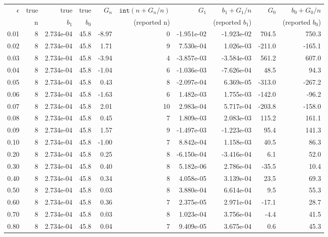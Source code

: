 \begin{tabular}{rrrrrrrrrr}
$\epsilon$ &  true &  true &  true &  $G_n$ &  $\texttt{int}(n+G_n/n)$ &  $G_1$ &  $b_1 + G_1/n$ &  $G_0$ &  $b_0 + G_0/n$\\ 
 &  n &  $b_1$ &  $b_0$ &   &  (reported n) &   &  (reported $b_1$) &   &  (reported $b_0$)\\ 
\hline
 \hline
 0.01 &  8 &  2.734e-04 &  45.8 &  -8.97 &  0 &  -1.951e-02 &  -1.923e-02 &  704.5 &  750.3\\ 
0.02 &  8 &  2.734e-04 &  45.8 &  1.71 &  9 &  7.530e-04 &  1.026e-03 &  -211.0 &  -165.1\\ 
0.03 &  8 &  2.734e-04 &  45.8 &  -3.94 &  4 &  -3.857e-03 &  -3.584e-03 &  561.2 &  607.0\\ 
0.04 &  8 &  2.734e-04 &  45.8 &  -1.04 &  6 &  -1.036e-03 &  -7.626e-04 &  48.5 &  94.3\\ 
0.05 &  8 &  2.734e-04 &  45.8 &  0.43 &  8 &  -2.097e-04 &  6.369e-05 &  -313.0 &  -267.2\\ 
0.06 &  8 &  2.734e-04 &  45.8 &  -1.63 &  6 &  1.482e-03 &  1.755e-03 &  -142.0 &  -96.2\\ 
0.07 &  8 &  2.734e-04 &  45.8 &  2.01 &  10 &  2.983e-04 &  5.717e-04 &  -203.8 &  -158.0\\ 
0.08 &  8 &  2.734e-04 &  45.8 &  0.45 &  7 &  1.809e-03 &  2.083e-03 &  115.2 &  161.1\\ 
0.09 &  8 &  2.734e-04 &  45.8 &  1.57 &  9 &  -1.497e-03 &  -1.223e-03 &  95.4 &  141.3\\ 
\hline
 0.10 &  8 &  2.734e-04 &  45.8 &  -1.00 &  7 &  8.842e-04 &  1.158e-03 &  40.5 &  86.3\\ 
0.20 &  8 &  2.734e-04 &  45.8 &  0.25 &  8 &  -6.150e-04 &  -3.416e-04 &  6.1 &  52.0\\ 
0.30 &  8 &  2.734e-04 &  45.8 &  0.40 &  8 &  5.182e-06 &  2.786e-04 &  -35.5 &  10.4\\ 
0.40 &  8 &  2.734e-04 &  45.8 &  0.34 &  8 &  4.058e-05 &  3.139e-04 &  23.5 &  69.3\\ 
0.50 &  8 &  2.734e-04 &  45.8 &  0.03 &  8 &  3.880e-04 &  6.614e-04 &  9.5 &  55.3\\ 
0.60 &  8 &  2.734e-04 &  45.8 &  0.36 &  7 &  2.375e-05 &  2.971e-04 &  -17.1 &  28.7\\ 
0.70 &  8 &  2.734e-04 &  45.8 &  0.03 &  8 &  1.023e-04 &  3.756e-04 &  -4.4 &  41.5\\ 
0.80 &  8 &  2.734e-04 &  45.8 &  0.04 &  7 &  9.409e-05 &  3.675e-04 &  0.6 &  45.3\\ 

\end{tabular}
